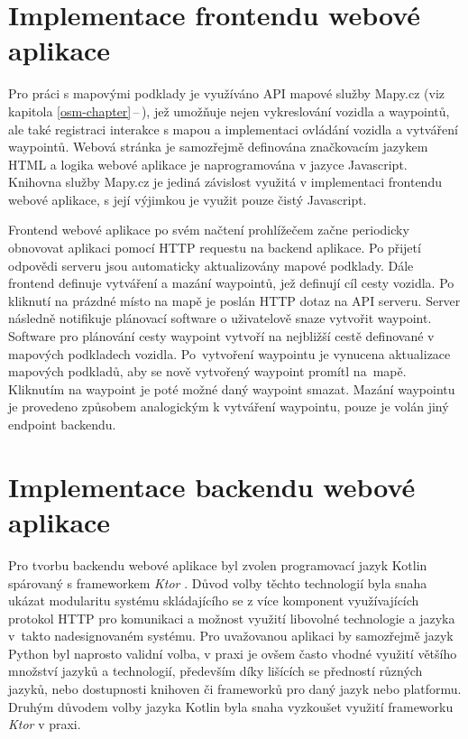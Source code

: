 \documentclass[czech, bachelor]{diploma}
\newcommand{\peteref}[1]{\ref{#1}\,--\,\nameref{#1}}
\begin{document}
\section{Implementace frontendu webové aplikace}

Pro práci s mapovými podklady je využíváno API mapové služby Mapy.cz \cite{mapycz-source} (viz kapitola \peteref{osm-chapter}),
jež umožňuje nejen vykreslování vozidla a waypointů, ale také registraci interakce s mapou a implementaci ovládání vozidla
a vytváření waypointů. Webová stránka je samozřejmě definována značkovacím jazykem HTML a logika webové aplikace je
naprogramována v jazyce Javascript. Knihovna služby Mapy.cz je jediná závislost využitá v implementaci frontendu webové aplikace,
s její výjimkou je využit pouze čistý Javascript.

Frontend webové aplikace po svém načtení prohlížečem začne periodicky obnovovat aplikaci pomocí HTTP requestu na backend aplikace.
Po přijetí odpovědi serveru jsou automaticky aktualizovány mapové podklady. Dále frontend definuje vytváření a mazání waypointů,
jež definují cíl cesty vozidla. Po kliknutí na prázdné místo na mapě je poslán HTTP dotaz na API serveru. Server následně
notifikuje plánovací software o uživatelově snaze vytvořit waypoint. Software pro plánování cesty waypoint vytvoří na nejbližší
cestě definované v mapových podkladech vozidla. Po~vytvoření waypointu je vynucena aktualizace mapových podkladů, aby se nově
vytvořený waypoint promítl na~mapě. Kliknutím na waypoint je poté možné daný waypoint smazat. Mazání waypointu je provedeno
způsobem analogickým k vytváření waypointu, pouze je volán jiný endpoint backendu.

\section{Implementace backendu webové aplikace}

Pro tvorbu backendu webové aplikace byl zvolen programovací jazyk Kotlin spárovaný s frameworkem \emph{Ktor} \cite{ktor-source}.
Důvod volby těchto technologií byla snaha ukázat modularitu systému skládajícího se z více komponent využívajících protokol HTTP
pro komunikaci a možnost využití libovolné technologie a jazyka v~takto nadesignovaném systému. Pro uvažovanou aplikaci
by samozřejmě jazyk Python byl naprosto validní volba, v praxi je ovšem často vhodné využití většího množství jazyků a
technologií, především díky lišících se předností různých jazyků, nebo dostupnosti knihoven či frameworků pro daný jazyk nebo
platformu. Druhým důvodem volby jazyka Kotlin byla snaha vyzkoušet využití frameworku \emph{Ktor} v praxi.
\end{document}
